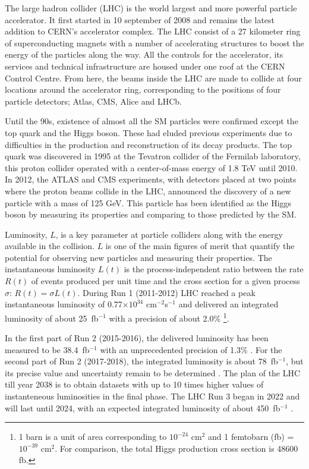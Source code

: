 \documentclass[final,12p]{article}
\newcommand{\lumi}[1]{{#1~fb$^{-1}$}}
\newcommand{\instlumi}[1]{#1$\times 10^{34}$ cm$^{-2}$s$^{-1}$}
\begin{document}
The large hadron collider (LHC) is the world largest and more powerful particle accelerator. It first started in 10 september of 2008 and remains the latest addition to CERN's accelerator complex. The LHC consist of a 27 kilometer ring of superconducting magnets with a number of accelerating structures to boost the energy of the particles along the way. All the controls for the accelerator, its services and technical infrastructure are housed under one roof at the CERN Control Centre. From here, the beams inside the LHC are made to collide at four locations around the accelerator ring, corresponding to the positions of four particle detectors; Atlas, CMS, Alice and LHCb.

Until the 90s, existence of almost all the SM particles were confirmed except the top quark and the Higgs boson. 
These had eluded previous experiments due to difficulties in the production and reconstruction of its decay products.
The top quark was discovered in 1995 at the Tevatron collider of the Fermilab laboratory, this proton collider operated with a center-of-mass energy of 1.8 TeV until 2010.
In 2012, the ATLAS and CMS experiments, with detectors placed at two points where the proton beams collide in the LHC, announced the discovery of a new particle with a mass of 125 GeV.
This particle has been identified as the Higgs boson by measuring its properties and comparing to those predicted by the SM.


Luminosity, $L$, is a key parameter at particle colliders along with the energy available in the collision.
$L$ is one of the  main figures of merit that quantify the potential for observing new particles and measuring their properties.
The instantaneous luminosity $L(t)$ is the process-independent ratio between the rate $R(t)$ of events produced per unit time and the cross section for a given process $\sigma$:  $R(t) = \sigma L(t)$.
During Run 1 (2011-2012) LHC reached a peak instantaneous luminosity of \instlumi{0.77} and delivered an integrated luminosity of about \lumi{25} with a precision of about 2.0\% 
\footnote{1 barn is a unit of area corresponding to $10^{-24}$ cm${^2}$ and 1 femtobarn (fb) = $10^{-39}$ cm$^{2}$. For comparison, the total Higgs production cross section is 48600 fb.}.


In the first part of Run 2 (2015-2016), the delivered luminosity has been measured to be \lumi{38.4} with an unprecedented precision of 1.3\% \cite{Sirunyan:2021qkt}.
For the second part of Run 2 (2017-2018), the integrated luminosity is about \lumi{78}, but its precise value and uncertainty remain to be determined \cite{CMS:2018elu}.
The plan of the LHC till year 2038 is to obtain datasets with up to 10 times higher values of instanteneous luminosities in the final phase.
The LHC Run 3 began in 2022 and will last until 2024, with an expected integrated luminosity of about \lumi{450} \cite{lumi-run3}. 
\end{document}
